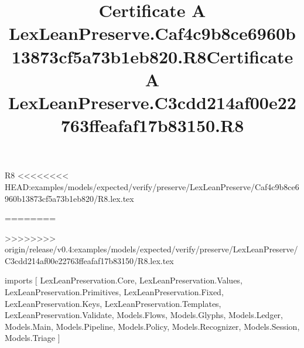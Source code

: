 \begin{lexlean}{R8}
<<<<<<<< HEAD:examples/models/expected/verify/preserve/LexLeanPreserve/Caf4c9b8ce6960b13873cf5a73b1eb820/R8.lex.tex
\title{Certificate A LexLeanPreserve.Caf4c9b8ce6960b13873cf5a73b1eb820.R8}
========
\title{Certificate A LexLeanPreserve.C3cdd214af00e22763ffeafaf17b83150.R8}
>>>>>>>> origin/release/v0.4:examples/models/expected/verify/preserve/LexLeanPreserve/C3cdd214af00e22763ffeafaf17b83150/R8.lex.tex
\begin{coremodule}
imports [
  LexLeanPreservation.Core,
  LexLeanPreservation.Values,
  LexLeanPreservation.Primitives,
  LexLeanPreservation.Fixed,
  LexLeanPreservation.Keys,
  LexLeanPreservation.Templates,
  LexLeanPreservation.Validate,
  Models.Flows,
  Models.Glyphs,
  Models.Ledger,
  Models.Main,
  Models.Pipeline,
  Models.Policy,
  Models.Recognizer,
  Models.Session,
  Models.Triage
]


\end{coremodule}
\end{lexlean}
